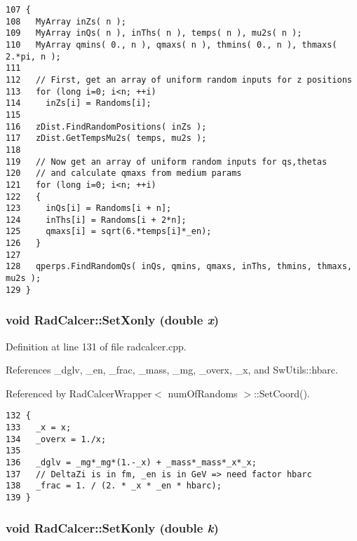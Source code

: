 \begin{Code}\begin{verbatim}107 {
108   MyArray inZs( n );
109   MyArray inQs( n ), inThs( n ), temps( n ), mu2s( n );
110   MyArray qmins( 0., n ), qmaxs( n ), thmins( 0., n ), thmaxs( 2.*pi, n );
111 
112   // First, get an array of uniform random inputs for z positions
113   for (long i=0; i<n; ++i)
114     inZs[i] = Randoms[i];
115 
116   zDist.FindRandomPositions( inZs );
117   zDist.GetTempsMu2s( temps, mu2s );
118   
119   // Now get an array of uniform random inputs for qs,thetas
120   // and calculate qmaxs from medium params
121   for (long i=0; i<n; ++i)
122   {
123     inQs[i] = Randoms[i + n];
124     inThs[i] = Randoms[i + 2*n];
125     qmaxs[i] = sqrt(6.*temps[i]*_en);
126   }
127   
128   qperps.FindRandomQs( inQs, qmins, qmaxs, inThs, thmins, thmaxs, mu2s );
129 }
\end{verbatim}
\end{Code}


\subsubsection{\setlength{\rightskip}{0pt plus 5cm}void RadCalcer::SetXonly (double {\em x})}\label{classRadCalcer_19c0def50051ee0a52a2cb311d8a485a}




Definition at line 131 of file radcalcer.cpp.

References \_\-dglv, \_\-en, \_\-frac, \_\-mass, \_\-mg, \_\-overx, \_\-x, and SwUtils::hbarc.

Referenced by RadCalcerWrapper$<$ numOfRandoms $>$::SetCoord().

\begin{Code}\begin{verbatim}132 {
133   _x = x;
134   _overx = 1./x;
135 
136   _dglv = _mg*_mg*(1.-_x) + _mass*_mass*_x*_x;
137   // DeltaZi is in fm, _en is in GeV => need factor hbarc
138   _frac = 1. / (2. * _x * _en * hbarc);
139 }
\end{verbatim}
\end{Code}


\subsubsection{\setlength{\rightskip}{0pt plus 5cm}void RadCalcer::SetKonly (double {\em k})}\label{classRadCalcer_49aa8982cec3cc56a881c843a74954e7}




